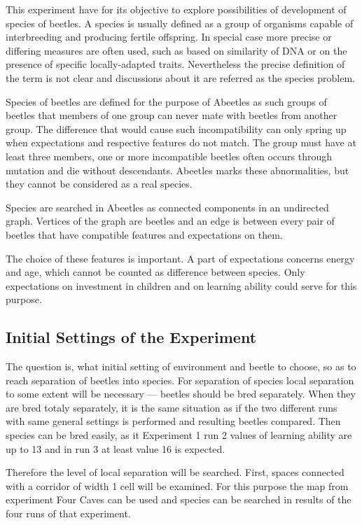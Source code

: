 \documentclass[a4paper,12pt]{report}
\begin{document}
This experiment have for its objective to explore possibilities of development of species of beetles. A species is usually defined as a group of organisms capable of interbreeding and producing fertile offspring. In special case more precise or differing measures are often used, such as based on similarity of DNA or on the presence of specific locally-adapted traits. Nevertheless the precise definition of the term is not clear and discussions about it are referred as the species problem.\cite{Species} 

Species of beetles are defined for the purpose of Abeetles as such groups of beetles that members of one group can never mate with beetles from another group. The difference that would cause such incompatibility can only spring up when expectations and respective features do not match. The group must have at least three members, one or more incompatible beetles often occurs through mutation and die without descendants. Abeetles marks these abnormalities, but they cannot be considered as a real species. 

Species are searched in Abeetles as connected components in an undirected graph. Vertices of the graph are beetles and an edge is between every pair of beetles that have compatible features and expectations on them.
 
The choice of these features is important. A part of expectations concerns energy and age, which cannot be counted as difference between species. Only expectations on investment in children and on learning ability could serve for this purpose. 

\subsection{Initial Settings of the Experiment}
The question is, what initial setting of environment and beetle to choose, so as to reach separation of beetles into species. For separation of species local separation to some extent will be necessary --- beetles should be bred separately. When they are bred totaly separately, it is the same situation as if the two different runs with same general settings is performed and resulting beetles compared. Then species can be bred easily, as it Experiment 1 run 2 values of learning ability are up to 13 and in run 3 at least value 16 is expected. 

Therefore the level of local separation will be searched. First, spaces connected with a corridor of width 1 cell will be examined. For this purpose the map from experiment Four Caves can be used and species can be searched in results of the four runs of that experiment.  
\end{document}
